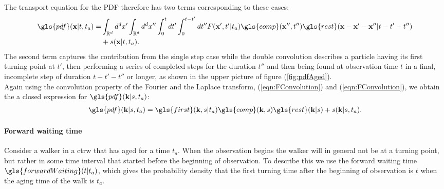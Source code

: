 The transport equation for the \gls{PDF} therefore has two terms corresponding to these cases:
%
\begin{align}
\gls{pdf}(\ve{x}|t,t_a) = &\int_{\mathbb{R}^d} d^{d}x' \int_{\mathbb{R}^d} d^{d}x'' \int_{0}^{t} dt' \int_{0}^{t-t'} d t''   F(\ve{x}',t'|t_a)  \gls{comp}(\ve{x}'',t'') \gls{rest}(\ve{x}-\ve{x}'-\ve{x}''| t-t'-t'') \nonumber \\
&+ s(\ve{x}|t,t_a).
\end{align}
%
The second term captures the contribution from the single step case while the double convolution describes a particle having its first turning point at $t'$, then performing a series of completed steps for the duration $t''$ and then being found at observation time $t$ in a final, incomplete step of duration $t-t'-t''$ or longer, as shown in the upper picture of figure (\ref{fig:pdfAged}).\\
Again using the convolution property of the Fourier and the Laplace transform,  (\ref{eqn:FConvolution}) and (\ref{eqn:FConvolution}), we obtain the a closed expression for $\gls{pdf}(\ve{k}|s,t_a)$:
%
\begin{align}
\gls{pdf}(\ve{k}|s,t_a) =  \gls{first}(\ve{k},s|t_a)  \gls{comp}(\ve{k},s) \gls{rest}(\ve{k}|s) + s(\ve{k}|s,t_a) \label{eqn:pdfAgedFourierLaplace}.
\end{align}


\paragraph{Forward waiting time}

Consider a walker in a \gls{ctrw} that has aged for a time $t_a$. When the observation begins the walker will in general not be at a turning point, but rather in some time interval that started before the beginning of observation. To describe this we use the forward waiting time $\gls{forwardWaiting}(t|t_a)$, which gives the probability density that the first turning time after the beginning of observation is $t$ when the aging time of the walk is $t_a$. \\

